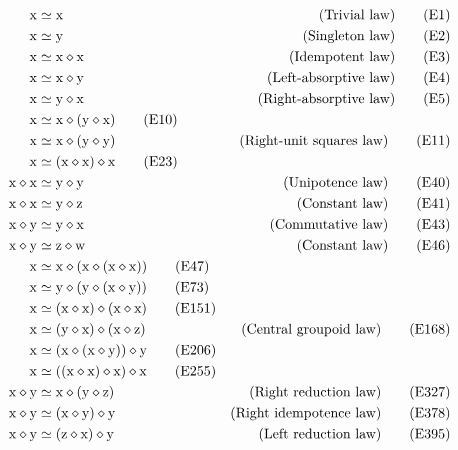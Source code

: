 \begin{align}
    \x &\formaleq \x & \hbox{(Trivial law)} \label{eq1}\tag{E1} \\
    \x &\formaleq \y & \hbox{(Singleton law)} \label{eq2}\tag{E2} \\
    \x &\formaleq \x \op \x & \hbox{(Idempotent law)} \label{eq3}\tag{E3} \\
    \x &\formaleq \x \op \y & \hbox{(Left-absorptive law)} \label{eq4}\tag{E4} \\
    \x &\formaleq \y \op \x & \hbox{(Right-absorptive law)} \label{eq5}\tag{E5} \\
    \x &\formaleq \x \op (\y \op \x) \label{eq10}\tag{E10} \\
    \x &\formaleq \x \op (\y \op \y) & \hbox{(Right-unit squares law)} \label{eq11}\tag{E11} \\
    \x &\formaleq (\x \op \x) \op \x \label{eq23}\tag{E23} \\
    \x \op \x &\formaleq \y \op \y & \hbox{(Unipotence law)} \label{eq40}\tag{E40} \\
    \x \op \x &\formaleq \y \op \z & \hbox{(Constant law)} \label{eq41}\tag{E41} \\
    \x \op \y &\formaleq \y \op \x & \hbox{(Commutative law)} \label{eq43}\tag{E43} \\
    \x \op \y &\formaleq \z \op \w & \hbox{(Constant law)} \label{eq46}\tag{E46} \\
    \x &\formaleq \x \op (\x \op (\x \op \x)) \label{eq47}\tag{E47} \\
    \x &\formaleq \y \op (\y \op (\x \op \y))  \label{eq73}\tag{E73} \\
    \x &\formaleq (\x \op \x) \op (\x \op \x) \label{eq151}\tag{E151} \\
    \x &\formaleq (\y \op \x) \op (\x \op \z) & \hbox{(Central groupoid law)} \label{eq168}\tag{E168} \\
    \x &\formaleq (\x \op (\x \op \y)) \op \y \label{eq206}\tag{E206} \\
    \x &\formaleq ((\x \op \x) \op \x) \op \x \label{eq255}\tag{E255} \\
    \x \op \y &\formaleq \x \op (\y \op \z) & \hbox{(Right reduction law)} \label{eq327}\tag{E327} \\
    \x \op \y &\formaleq (\x \op \y) \op \y & \hbox{(Right idempotence law)} \label{eq378}\tag{E378} \\
    \x \op \y &\formaleq (\z \op \x) \op \y & \hbox{(Left reduction law)} \label{eq395}\tag{E395} \\

\end{align}
